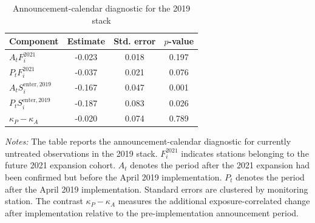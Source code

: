 \begin{table}[!htbp]
\centering
\caption{Announcement-calendar diagnostic for the 2019 stack}
\label{tab:ulez_announcement_2019}
\small
\begin{threeparttable}
\begin{tabular}{lccc}
\toprule
Component & Estimate & Std. error & $p$-value \\
\midrule
$A_tF_i^{2021}$ & -0.023 & 0.018 & 0.197 \\
$P_tF_i^{2021}$ & -0.037 & 0.021 & 0.076 \\
$A_tS_i^{\mathrm{enter},2019}$ & -0.167 & 0.047 & 0.001 \\
$P_tS_i^{\mathrm{enter},2019}$ & -0.187 & 0.083 & 0.026 \\
\midrule
$\kappa_P-\kappa_A$ & -0.020 & 0.074 & 0.789 \\
\bottomrule
\end{tabular}
\begin{tablenotes}
\footnotesize
\item \emph{Notes:} The table reports the announcement-calendar diagnostic for currently untreated observations in the 2019 stack. $F_i^{2021}$ indicates stations belonging to the future 2021 expansion cohort. $A_t$ denotes the period after the 2021 expansion had been confirmed but before the April 2019 implementation. $P_t$ denotes the period after the April 2019 implementation. Standard errors are clustered by monitoring station. The contrast $\kappa_P-\kappa_A$ measures the additional exposure-correlated change after implementation relative to the pre-implementation announcement period.
\end{tablenotes}
\end{threeparttable}
\end{table}
